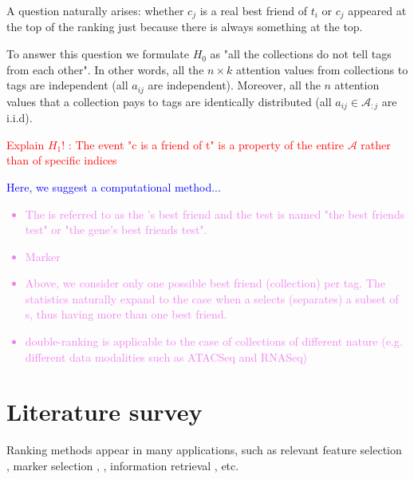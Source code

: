 \documentclass{llncs}
\begin{document}
A question naturally arises: whether $c_j$ is a real best friend of $t_i$ or $c_j$ appeared at the top of the ranking just because there is always something at the top.

To answer this question we formulate $H_0$ as "all the collections do not tell tags from each other".
In other words, all the $n \times k$ attention values from collections to tags are independent (all $a_{ij}$ are independent). Moreover, all the $n$ attention values that a collection pays to tags are identically distributed (all $a_{ij} \in \mathcal{A}_{:j}$ are i.i.d).




\textcolor{red}{Explain $H_1$! : The event "c is a friend of t" is a property of the entire $\mathcal{A}$ rather than of specific indices}

\textcolor{blue}{Here, we suggest a computational method...}

\textcolor{violet}{\begin{itemize}
    \item The {\collection} is referred to as the {\tag}'s best friend and the test is named "the best friends test" or "the gene's best friends test".
    \item Marker
    \item Above, we consider only one possible best friend (collection) per tag. The statistics naturally expand to the case when a {\tag} selects (separates) a subset of {\collection}s, thus having more than one best friend.
    \item double-ranking is applicable to the case of collections of different nature (e.g. different data modalities such as ATACSeq and RNASeq)
\end{itemize}}


\section{Literature survey}

Ranking methods appear in many applications, such as relevant feature selection \cite{venetis2011selection}, 
marker selection \cite{vargo2020rank}, \cite{pullin2022comparison},
information retrieval \cite{jimenez2021multivariate}, etc.
\end{document}
